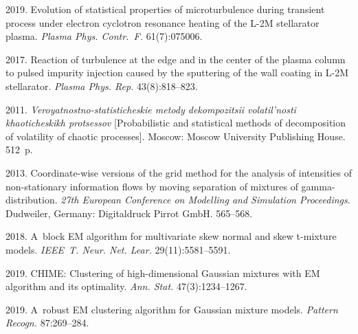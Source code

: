  \begin{multicols}{2}

\renewcommand{\bibname}{\protect\rmfamily References}

{\small\frenchspacing
 {%
 \begin{thebibliography}{99}
 2019. Evolution of statistical properties of microturbulence 
 during transient process under electron cyclotron resonance 
 heating of the L-2M stellarator plasma. \textit{Plasma Phys. 
 Contr.~F.} 61(7):075006.

 2017. Reaction of turbulence at the edge and in the center of
  the plasma column to pulsed impurity injection caused by the 
  sputtering of the wall coating in L-2M stellarator. \textit{Plasma Phys. 
  Rep.} 43(8):818--823.

 2011. \textit{Veroyatnostno-statisticheskie metody dekompozitsii
volatil'nosti khaoticheskikh protsessov} 
[Probabilistic and statistical methods of decomposition of volatility 
of chaotic processes]. Moscow: Moscow University Publishing House. 512~p.

 2013.
Coordinate-wise versions of the grid method for the analysis 
of intensities of non-stationary information flows by moving separation
 of mixtures of gamma-distribution. \textit{27th 
 European Conference on Modelling and Simulation Proceedings}. 
 Dudweiler, Germany: Digitaldruck Pirrot GmbH. 565--568.

 2018. 
A~block EM algorithm for multivariate skew normal and skew t-mixture models. 
\textit{IEEE~T. Neur. Net. Lear.} 29(11):5581--5591.

 2019. CHIME: Clustering of 
high-dimensional Gaussian mixtures with EM algorithm and its optimality. 
\textit{Ann. Stat.} 47(3):1234--1267.



 2019. 
A~robust EM clustering algorithm for Gaussian mixture models. 
\textit{Pattern Recogn.} 87:269--284.


\end{thebibliography}}}
\end{multicols}
